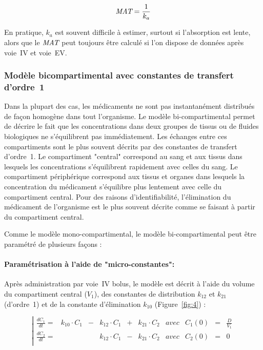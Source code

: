 \begin{equation}
\operatorname{\textit{MAT}} = \frac{1}{k_a}
\label{eq:23}
\end{equation}

En pratique, $k_a$ est souvent difficile à estimer, surtout si l'absorption est lente, alors que le $\operatorname{\textit{MAT}}$ peut toujours être calculé si l'on dispose de données après voie~\gls{IV} et voie~\gls{EV}.

\subsubsection{Modèle bicompartimental avec constantes de transfert d'ordre~1}
Dans la plupart des cas, les médicaments ne sont pas instantanément distribués de façon homogène dans tout l'organisme. Le modèle bi-compartimental permet de décrire le fait que les concentrations dans deux groupes de tissus ou de fluides biologiques ne s'équilibrent pas immédiatement. Les échanges entre ces compartiments sont le plus souvent décrits par des constantes de transfert d'ordre~1. Le compartiment "central" correspond au sang et aux tissus dans lesquels les concentrations s'équilibrent rapidement avec celles du sang. Le compartiment périphérique correspond aux tissus et organes dans lesquels la concentration du médicament s'équilibre plus lentement avec celle du compartiment central. Pour des raisons d'identifiabilité, l'élimination du médicament de l'organisme est le plus souvent décrite comme se faisant à partir du compartiment central.

Comme le modèle mono-compartimental, le modèle bi-compartimental peut être paramétré de plusieurs façons :

\paragraph*{Paramétrisation à l'aide de "micro-constantes":} Après administration par voie~\gls{IV} bolus, le modèle est décrit à l'aide du volume du compartiment central ($V_1$), des constantes de distribution $k_{12}$ et $k_{21}$ (d'ordre~1) et de la constante d'élimination $k_{10}$ (Figure~\ref{fig:4}) :

\begin{equation}
\left| \begin{matrix}
\frac{dC_1}{dt} = & k_{10}\cdot C_1 &- &k_{12}\cdot C_1 & + & k_{21}\cdot C_2 & avec & C_1(0)&=&\frac{D}{V_1}\\ 
\frac{dC_2}{dt} = &                 &  &k_{12}\cdot C_1 & - & k_{21}\cdot C_2 & avec & C_2(0)&=&0 \\ 
\end{matrix}\right.
\label{eq:24}
\end{equation}

